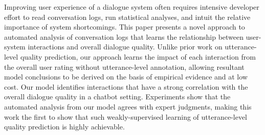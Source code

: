 Improving user experience of a dialogue system often requires intensive developer effort to read conversation logs, run statistical analyses, and intuit the relative importance of system shortcomings. This paper presents a novel approach to automated analysis of conversation logs that learns the relationship between user-system interactions and overall dialogue quality. Unlike prior work on utterance-level quality prediction, our approach learns the impact of each interaction from the overall user rating without utterance-level annotation, allowing resultant model conclusions to be derived on the basis of empirical evidence and at low cost. Our model identifies interactions that have a strong correlation with the overall dialogue quality in a chatbot setting. Experiments show that the automated analysis from our model agrees with expert judgments, making this work the first to show that such weakly-supervised learning of utterance-level quality prediction is highly achievable.
